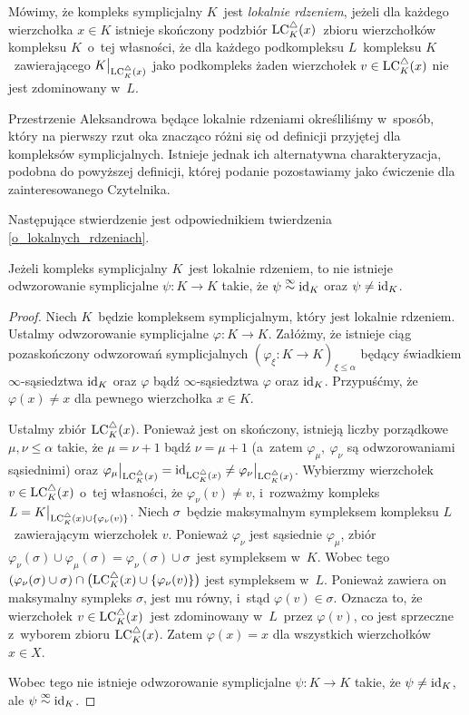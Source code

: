 Mówimy, że kompleks symplicjalny $K$~jest \textit{lokalnie rdzeniem}, jeżeli dla każdego wierzchołka $x\in K$ istnieje skończony podzbiór $\operatorname{LC}^\triangle_K(x)$~zbioru wierzchołków kompleksu $K$~o~tej własności, że dla każdego podkompleksu $L$~kompleksu $K$~zawierającego $K\big|_{\operatorname{LC}^\triangle_K(x)}$ jako podkompleks żaden wierzchołek $v\in \operatorname{LC}^\triangle_K(x)$ nie jest zdominowany w~$L$.

Przestrzenie Aleksandrowa będące lokalnie rdzeniami określiliśmy w~sposób, który na pierwszy rzut oka znacząco różni się od definicji przyjętej dla kompleksów symplicjalnych. Istnieje jednak ich alternatywna charakteryzacja, podobna do powyższej definicji, której podanie pozostawiamy jako ćwiczenie dla zainteresowanego Czytelnika.

Następujące stwierdzenie jest odpowiednikiem twierdzenia \ref{o_lokalnych_rdzeniach}.

\begin{stw}\label{stw-symplicjalne_o_lokalnych_rdzeniach}
Jeżeli kompleks symplicjalny $K$~jest lokalnie rdzeniem, to nie istnieje odwzorowanie symplicjalne $\psi\colon K\to K$ takie, że $\psi\stackrel{\infty}{\sim}\operatorname{id}_K$ oraz $\psi\not=\operatorname{id}_K$.
\end{stw}
\begin{proof}
Niech $K$~będzie kompleksem symplicjalnym, który jest lokalnie rdzeniem. Ustalmy odwzorowanie symplicjalne $\varphi\colon K\to K$. Załóżmy, że istnieje ciąg pozaskończony odwzorowań symplicjalnych $\left(\varphi_\xi\colon K\to K\right)_{\xi\leq\alpha}$ będący świadkiem $\infty$-sąsiedztwa $\operatorname{id}_K$ oraz $\varphi$ bądź $\infty$-sąsiedztwa $\varphi$ oraz $\operatorname{id}_K$. Przypuśćmy, że $\varphi(x)\not=x$ dla pewnego wierzchołka $x\in K$.

Ustalmy zbiór $\operatorname{LC}^\triangle_K(x)$. Ponieważ jest on skończony, istnieją liczby porządkowe $\mu,\nu\leq \alpha$ takie, że $\mu=\nu+1$ bądź $\nu=\mu+1$ (a~zatem $\varphi_\mu,\ \varphi_\nu$ są odwzorowaniami sąsiednimi) oraz $\varphi_\mu\big|_{\operatorname{LC}^\triangle_K(x)}=\operatorname{id}_{\operatorname{LC}^\triangle_K(x)}\not=\varphi_\nu\big|_{\operatorname{LC}^\triangle_K(x)}$. Wybierzmy wierzchołek $v\in \operatorname{LC}^\triangle_K(x)$ o~tej własności, że $\varphi_\nu(v)\not=v$, i~rozważmy kompleks $L=K\big|_{\operatorname{LC}^\triangle_K(x)\cup\{\varphi_\nu(v)\}}$. Niech $\sigma$~będzie maksymalnym sympleksem kompleksu $L$~zawierającym wierzchołek $v$. Ponieważ $\varphi_\nu$ jest sąsiednie $\varphi_\mu$, zbiór $\varphi_\nu(\sigma)\cup\varphi_\mu(\sigma)=\varphi_\nu(\sigma)\cup\sigma$~jest sympleksem w~$K$. Wobec tego $(\varphi_\nu(\sigma)\cup\sigma)\cap \bigl(\operatorname{LC}^\triangle_K(x)\cup\{\varphi_\nu(v)\}\bigr)$ jest sympleksem w~$L$. Ponieważ zawiera on maksymalny sympleks $\sigma$, jest mu równy, i~stąd $\varphi(v)\in\sigma$. Oznacza to, że wierzchołek $v\in\operatorname{LC}^\triangle_K(x)$~jest zdominowany w~$L$~przez $\varphi(v)$, co jest sprzeczne z~wyborem zbioru $\operatorname{LC}^\triangle_K(x)$. Zatem $\varphi(x)=x$ dla wszystkich wierzchołków $x\in X$.

Wobec tego nie istnieje odwzorowanie symplicjalne $\psi\colon K\to K$ takie, że $\psi\not=\operatorname{id}_K$, ale $\psi\stackrel{\infty}{\sim}\operatorname{id}_K$.
\end{proof}

